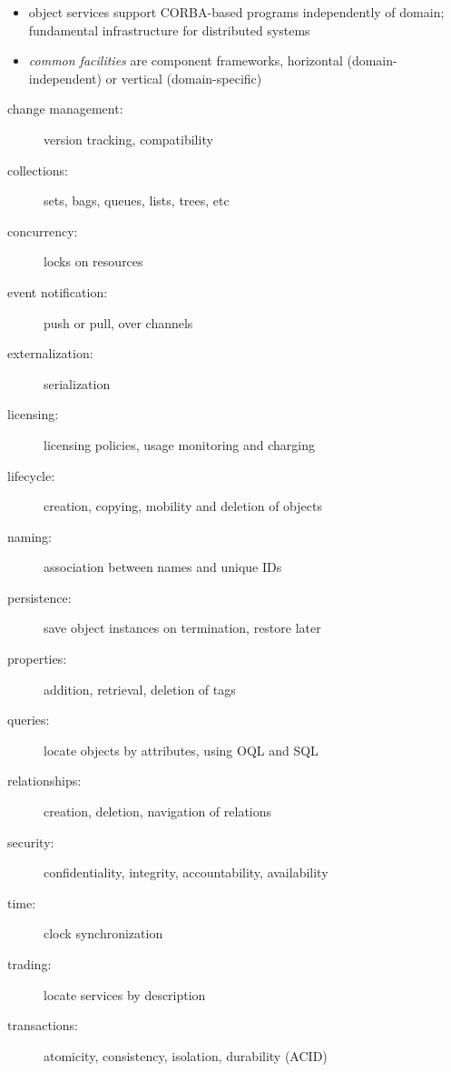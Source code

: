 \documentclass{sepslide-soa-faked} %
\begin{document}
\begin{slide}
\begin{itemize}
\item object services support CORBA-based programs independently of domain;
  fundamental infrastructure for distributed systems
\item \emph{common facilities} are component frameworks, 
  horizontal (domain-independent) or vertical (domain-specific)
\end{itemize}
\end{slide}

\begin{slide}
\begin{description}
\item[change management:]
  version tracking, compatibility 
\item[collections:]
  sets, bags, queues, lists, trees, etc
\item[concurrency:]
  locks on resources
\item[event notification:]
  push or pull, over channels
\item[externalization:]
  serialization
\item[licensing:]
  licensing policies, usage monitoring and charging
\item[lifecycle:]
  creation, copying, mobility and deletion of objects
\item[naming:]
  association between names and unique IDs
\end{description}
\end{slide}

\begin{slide}
\begin{description}
\item[persistence:]
  save object instances on termination, restore later
\item[properties:]
  addition, retrieval, deletion of tags
\item[queries:]
  locate objects by attributes, using OQL and SQL
\item[relationships:]
  creation, deletion, navigation of relations
\item[security:]
  confidentiality, integrity, accountability, availability
\item[time:]
  clock synchronization
\item[trading:]
  locate services by description
\item[transactions:]
  atomicity, consistency, isolation, durability (ACID)
\end{description}
\end{slide}
\end{document}
